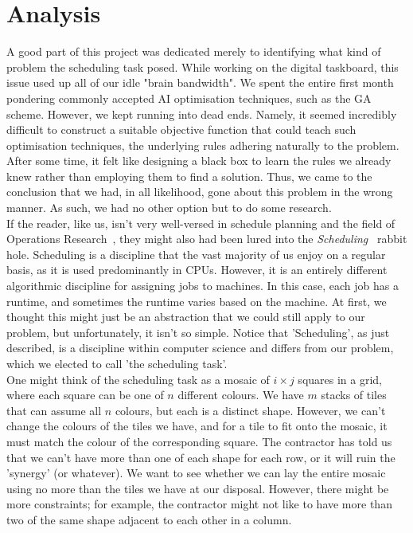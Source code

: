 \section{Analysis}
A good part of this project was dedicated merely to identifying what kind of problem the scheduling task posed. While working on the digital taskboard, this issue used up all of our idle "brain bandwidth". We spent the entire first month pondering commonly accepted AI optimisation techniques, such as the GA scheme. However, we kept running into dead ends. Namely, it seemed incredibly difficult to construct a suitable objective function that could teach such optimisation techniques, the underlying rules adhering naturally to the problem. After some time, it felt like designing a black box to learn the rules we already knew rather than employing them to find a solution. Thus, we came to the conclusion that we had, in all likelihood, gone about this problem in the wrong manner. As such, we had no other option but to do some research.
\\
If the reader, like us, isn't very well-versed in schedule planning and the field of Operations Research~\cite{Wiki-Operations-Research}, they might also had been lured into the \emph{Scheduling}~\cite{Wiki-Scheduling-computing, Wiki-Optimal-job-scheduling, Wiki-Job-shop-scheduling} rabbit hole. Scheduling is a discipline that the vast majority of us enjoy on a regular basis, as it is used predominantly in CPUs. However, it is an entirely different algorithmic discipline for assigning jobs to machines. In this case, each job has a runtime, and sometimes the runtime varies based on the machine. At first, we thought this might just be an abstraction that we could still apply to our problem, but unfortunately, it isn't so simple. Notice that 'Scheduling', as just described, is a discipline within computer science and differs from our problem, which we elected to call 'the scheduling task'.
\\
One might think of the scheduling task as a mosaic of \(i \times j\) squares in a grid, where each square can be one of \(n\) different colours. We have \(m\) stacks of tiles that can assume all \(n\) colours, but each is a distinct shape. However, we can't change the colours of the tiles we have, and for a tile to fit onto the mosaic, it must match the colour of the corresponding square. The contractor has told us that we can't have more than one of each shape for each row, or it will ruin the 'synergy' (or whatever). We want to see whether we can lay the entire mosaic using no more than the tiles we have at our disposal. However, there might be more constraints; for example, the contractor might not like to have more than two of the same shape adjacent to each other in a column.
